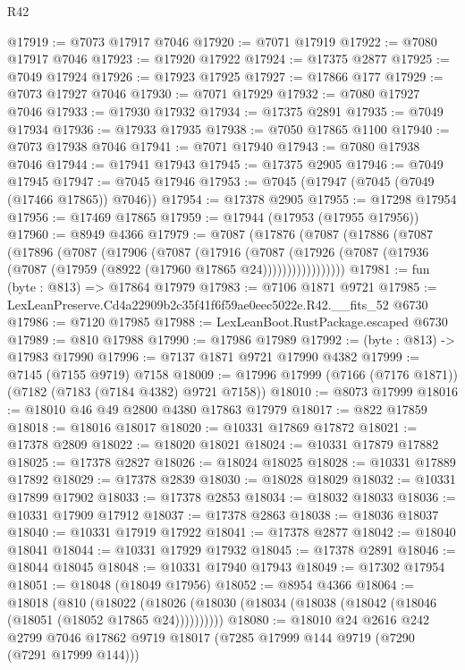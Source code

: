 \begin{lexlean}{R42}
\begin{coremodule}
{@17919 := @7073 @17917 @7046
@17920 := @7071 @17919
@17922 := @7080 @17917 @7046
@17923 := @17920 @17922
@17924 := @17375 @2877
@17925 := @7049 @17924
@17926 := @17923 @17925
@17927 := @17866 @177
@17929 := @7073 @17927 @7046
@17930 := @7071 @17929
@17932 := @7080 @17927 @7046
@17933 := @17930 @17932
@17934 := @17375 @2891
@17935 := @7049 @17934
@17936 := @17933 @17935
@17938 := @7050 @17865 @1100
@17940 := @7073 @17938 @7046
@17941 := @7071 @17940
@17943 := @7080 @17938 @7046
@17944 := @17941 @17943
@17945 := @17375 @2905
@17946 := @7049 @17945
@17947 := @7045 @17946
@17953 := @7045 (@17947 (@7045 (@7049 (@17466 @17865)) @7046))
@17954 := @17378 @2905
@17955 := @17298 @17954
@17956 := @17469 @17865
@17959 := @17944 (@17953 (@17955 @17956))
@17960 := @8949 @4366
@17979 := @7087
    (@17876
      (@7087
        (@17886
          (@7087
            (@17896
              (@7087
                (@17906
                  (@7087
                    (@17916
                      (@7087
                        (@17926
                          (@7087 (@17936 (@7087 (@17959 (@8922 (@17960 @17865 @24)))))))))))))))))
@17981 := fun (byte : @813) => @17864 @17979
@17983 := @7106 @1871 @9721
@17985 := LexLeanPreserve.Cd4a22909b2c35f41f6f59ae0eec5022e.R42.__fits_52 @6730
@17986 := @7120 @17985
@17988 := LexLeanBoot.RustPackage.escaped @6730
@17989 := @810 @17988
@17990 := @17986 @17989
@17992 := (byte : @813) -> @17983 @17990
@17996 := @7137 @1871 @9721 @17990 @4382
@17999 := @7145 (@7155 @9719) @7158
@18009 := @17996 @17999 (@7166 (@7176 @1871)) (@7182 (@7183 (@7184 @4382) @9721 @7158))
@18010 := @8073 @17999
@18016 := @18010 @46 @49 @2800 @4380 @17863 @17979
@18017 := @822 @17859
@18018 := @18016 @18017
@18020 := @10331 @17869 @17872
@18021 := @17378 @2809
@18022 := @18020 @18021
@18024 := @10331 @17879 @17882
@18025 := @17378 @2827
@18026 := @18024 @18025
@18028 := @10331 @17889 @17892
@18029 := @17378 @2839
@18030 := @18028 @18029
@18032 := @10331 @17899 @17902
@18033 := @17378 @2853
@18034 := @18032 @18033
@18036 := @10331 @17909 @17912
@18037 := @17378 @2863
@18038 := @18036 @18037
@18040 := @10331 @17919 @17922
@18041 := @17378 @2877
@18042 := @18040 @18041
@18044 := @10331 @17929 @17932
@18045 := @17378 @2891
@18046 := @18044 @18045
@18048 := @10331 @17940 @17943
@18049 := @17302 @17954
@18051 := @18048 (@18049 @17956)
@18052 := @8954 @4366
@18064 := @18018
    (@810
      (@18022 (@18026 (@18030 (@18034 (@18038 (@18042 (@18046 (@18051 (@18052 @17865 @24))))))))))
@18080 := @18010
    @24
    @2616
    @242
    @2799
    @7046
    @17862
    @9719
    @18017
    (@7285 @17999 @144 @9719 (@7290 (@7291 @17999 @144)))
}
\end{coremodule}
\end{lexlean}
